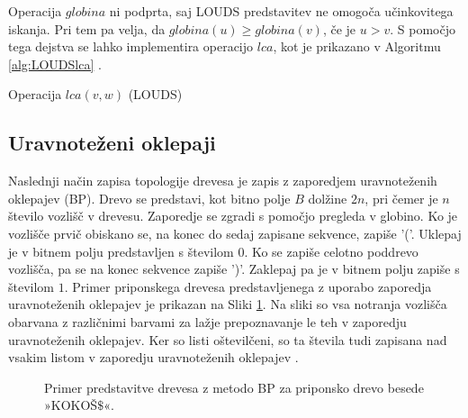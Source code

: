  Operacija $globina$ ni podprta, saj LOUDS predstavitev ne omogoča učinkovitega iskanja. Pri tem pa velja, da $globina(u)\ge globina(v)$, če je $u>v$. S pomočjo tega dejstva se lahko implementira operacijo $lca$, kot je prikazano v Algoritmu \ref{alg:LOUDSlca} \cite{Navarro2016}.
 
 \begin{algorithm}[hbt]

\caption{Operacija $lca(v,w)$ (LOUDS)}\label{alg:LOUDSlca}
{
    
}
\end{algorithm}


\subsection{Uravnoteženi oklepaji}\label{sec:oklepaji}

Naslednji način zapisa topologije drevesa je zapis z zaporedjem uravnoteženih oklepajev (BP). Drevo se predstavi, kot bitno polje $B$ dolžine $2n$, pri čemer je $n$ število vozlišč v drevesu. Zaporedje se zgradi s pomočjo pregleda v globino. Ko je vozlišče prvič obiskano se, na konec do sedaj zapisane sekvence, zapiše '('. Uklepaj je v bitnem polju predstavljen s številom $0$. Ko se zapiše celotno poddrevo vozlišča, pa se na konec sekvence zapiše ')'. Zaklepaj pa je v bitnem polju zapiše s številom $1$. Primer priponskega drevesa predstavljenega z uporabo zaporedja uravnoteženih oklepajev je prikazan na Sliki \ref{fig:BP}. Na sliki so vsa notranja vozlišča obarvana z različnimi barvami za lažje prepoznavanje le teh v zaporedju uravnoteženih oklepajev. Ker so listi oštevilčeni, so ta števila tudi zapisana nad vsakim listom v zaporedju uravnoteženih oklepajev \cite{Navarro2016}.

\begin{figure}[htb]
    \begin{center}
        
        \caption{Primer predstavitve drevesa z metodo BP za priponsko drevo besede »KOKOŠ$\$$«.} 
        \label{fig:BP}
    \end{center}
\end{figure}


